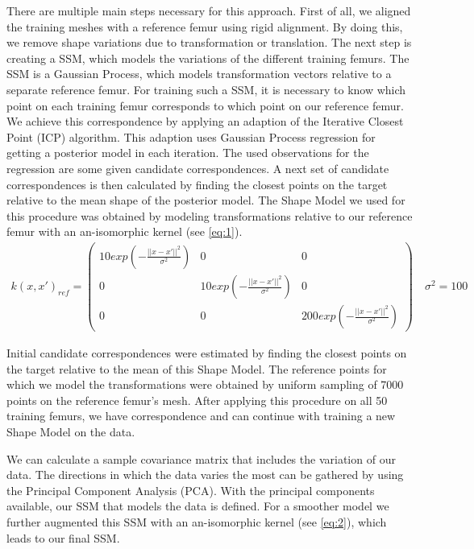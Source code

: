 \documentclass{article}
\begin{document}
	There are multiple main steps necessary for this approach. 
	First of all, we aligned the training meshes with a reference femur using rigid alignment.
	By doing this, we remove shape variations due to transformation or translation. 
	The next step is creating a SSM, which models the variations of the different training femurs.
	The SSM is a Gaussian Process, which models transformation vectors relative to a separate reference femur.
	For training such a SSM, it is necessary to know which point on each training femur corresponds to which point on our reference femur. 
	We achieve this correspondence by applying an adaption of the Iterative Closest Point (ICP) algorithm. 
	This adaption uses Gaussian Process regression for getting a posterior model in each iteration.
	The used observations for the regression are some given candidate correspondences. 
	A next set of candidate correspondences is then calculated by finding the closest points on the target relative to the mean shape of the posterior model.
	The Shape Model we used for this procedure was obtained by modeling transformations relative to our reference femur with an an-isomorphic kernel (see \autoref{eq:1}).
	\begin{align}
	k(x, x')_{ref} =
	\begin{pmatrix}
	10 exp(-\frac{||x-x'||^2}{\sigma^2})       & 0 & 0 \\
	0      & 10 exp(-\frac{||x-x'||^2}{\sigma^2}) & 0  \\
	0      & 0 &  200 exp(-\frac{||x-x'||^2}{\sigma^2})
	\end{pmatrix}
	\quad \sigma^2 = 100 
	\label{eq:1}
	\end{align}
	
	Initial candidate correspondences were estimated by finding the closest points on the target relative to the mean of this Shape Model.
	The reference points for which we model the transformations were obtained by uniform sampling of 7000 points on the reference femur's mesh.
	After applying this procedure on all 50 training femurs, we have correspondence and can continue with training a new Shape Model on the data.
	
	We can calculate a sample covariance matrix that includes the variation of our data. The directions in which the data varies the most can be gathered by using the Principal Component Analysis (PCA). With the principal components available, our SSM that models the data is defined. For a smoother model we further augmented this SSM with an an-isomorphic kernel (see \autoref{eq:2}), which leads to our final SSM.
	
\end{document}
